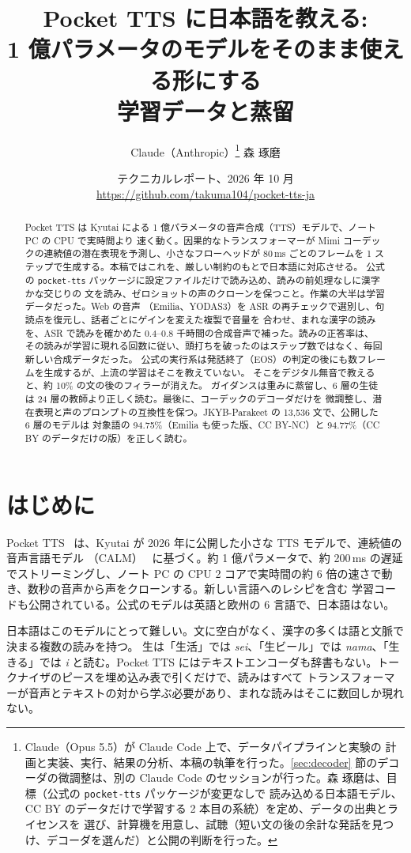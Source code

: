 \documentclass[10pt,a4paper,twocolumn]{article}
\title{\Large\bfseries Pocket TTS に日本語を教える:\\
1 億パラメータのモデルをそのまま使える形にする\\学習データと蒸留}
\author{Claude（Anthropic）\thanks{Claude（Opus 5.5）が Claude Code 上で、データパイプラインと実験の
計画と実装、実行、結果の分析、本稿の執筆を行った。\ref{sec:decoder} 節のデコーダの微調整は、別の
Claude Code のセッションが行った。森 琢磨は、目標（公式の \texttt{pocket-tts} パッケージが変更なしで
読み込める日本語モデル、CC BY のデータだけで学習する 2 本目の系統）を定め、データの出典とライセンスを
選び、計算機を用意し、試聴（短い文の後の余計な発話を見つけ、デコーダを選んだ）と公開の判断を行った。}
\qquad 森 琢磨}
\date{{\small テクニカルレポート、2026 年 10 月}\\
{\small\url{https://github.com/takuma104/pocket-tts-ja}}}
\begin{document}
\maketitle

\begin{abstract}
Pocket TTS は Kyutai による 1 億パラメータの音声合成（TTS）モデルで、ノート PC の CPU で実時間より
速く動く。因果的なトランスフォーマーが Mimi コーデックの連続値の潜在表現を予測し、小さなフローヘッドが
80\,ms ごとのフレームを 1 ステップで生成する。本稿ではこれを、厳しい制約のもとで日本語に対応させる。
公式の \texttt{pocket-tts} パッケージに設定ファイルだけで読み込め、読みの前処理なしに漢字かな交じりの
文を読み、ゼロショットの声のクローンを保つこと。作業の大半は学習データだった。Web の音声
（Emilia、YODAS3）を ASR の再チェックで選別し、句読点を復元し、話者ごとにゲインを変えた複製で音量を
合わせ、まれな漢字の読みを、ASR で読みを確かめた 0.4--0.8 千時間の合成音声で補った。読みの正答率は、
その読みが学習に現れる回数に従い、頭打ちを破ったのはステップ数ではなく、毎回新しい合成データだった。
公式の実行系は発話終了（EOS）の判定の後にも数フレームを生成するが、上流の学習はそこを教えていない。
そこをデジタル無音で教えると、約 10\% の文の後のフィラーが消えた。
ガイダンスは重みに蒸留し、6 層の生徒は 24 層の教師より正しく読む。最後に、コーデックのデコーダだけを
微調整し、潜在表現と声のプロンプトの互換性を保つ。JKYB-Parakeet の 13,536 文で、公開した 6 層のモデルは
対象語の 94.75\%（Emilia も使った版、CC BY-NC）と 94.77\%（CC BY のデータだけの版）を正しく読む。
\end{abstract}

\section{はじめに}
Pocket TTS~\cite{pocket} は、Kyutai が 2026 年に公開した小さな TTS モデルで、連続値の音声言語モデル
（CALM）~\cite{calm} に基づく。約 1 億パラメータで、約 200\,ms の遅延でストリーミングし、ノート PC の
CPU 2 コアで実時間の約 6 倍の速さで動き、数秒の音声から声をクローンする。新しい言語へのレシピを含む
学習コードも公開されている。公式のモデルは英語と欧州の 6 言語で、日本語はない。

日本語はこのモデルにとって難しい。文に空白がなく、漢字の多くは語と文脈で決まる複数の読みを持つ。
生は「生活」では \emph{sei}、「生ビール」では \emph{nama}、「生きる」では \emph{i} と読む。Pocket TTS
にはテキストエンコーダも辞書もない。トークナイザのピースを埋め込み表で引くだけで、読みはすべて
トランスフォーマーが音声とテキストの対から学ぶ必要があり、まれな読みはそこに数回しか現れない。
\end{document}
